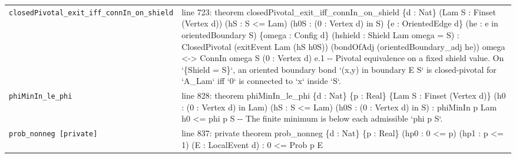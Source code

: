 \documentclass[10pt]{article}
\begin{document}
\begin{longtable}{>{\raggedright\arraybackslash}p{} >{\raggedright\arraybackslash}p{}}
\texttt{closedPivotal\_\allowbreak{}exit\_\allowbreak{}iff\_\allowbreak{}connIn\_\allowbreak{}on\_\allowbreak{}shield} & {\ttfamily\scriptsize line 723:\allowbreak{} theorem closedPivotal\_\allowbreak{}exit\_\allowbreak{}iff\_\allowbreak{}connIn\_\allowbreak{}on\_\allowbreak{}shield \{d :\allowbreak{} Nat\} (\allowbreak{}Lam S :\allowbreak{} Finset (\allowbreak{}Vertex d)\allowbreak{})\allowbreak{} (\allowbreak{}hS :\allowbreak{} S <=\allowbreak{} Lam)\allowbreak{} (\allowbreak{}h0S :\allowbreak{} (\allowbreak{}0 :\allowbreak{} Vertex d)\allowbreak{} in S)\allowbreak{} \{e :\allowbreak{} OrientedEdge d\} (\allowbreak{}he :\allowbreak{} e in orientedBoundary S)\allowbreak{} \{omega :\allowbreak{} Config d\} (\allowbreak{}hshield :\allowbreak{} Shield Lam omega =\allowbreak{} S)\allowbreak{} :\allowbreak{} ClosedPivotal (\allowbreak{}exitEvent Lam (\allowbreak{}hS h0S)\allowbreak{})\allowbreak{} (\allowbreak{}bondOfAdj (\allowbreak{}orientedBoundary\_\allowbreak{}adj he)\allowbreak{})\allowbreak{} omega <-\allowbreak{}> ConnIn omega S (\allowbreak{}0 :\allowbreak{} Vertex d)\allowbreak{} e.\allowbreak{}1 -\allowbreak{}-\allowbreak{} Pivotal equivalence on a fixed shield value.\allowbreak{} On `\{Shield =\allowbreak{} S\}`,\allowbreak{} an oriented boundary bond `(\allowbreak{}x,\allowbreak{}y)\allowbreak{} in boundary E S` is closed-\allowbreak{}pivotal for `A\_\allowbreak{}Lam` iff `0` is connected to `x` inside `S`.\allowbreak{}} \\[0.45em]
\texttt{phiMinIn\_\allowbreak{}le\_\allowbreak{}phi} & {\ttfamily\scriptsize line 828:\allowbreak{} theorem phiMinIn\_\allowbreak{}le\_\allowbreak{}phi \{d :\allowbreak{} Nat\} \{p :\allowbreak{} Real\} \{Lam S :\allowbreak{} Finset (\allowbreak{}Vertex d)\allowbreak{}\} (\allowbreak{}h0 :\allowbreak{} (\allowbreak{}0 :\allowbreak{} Vertex d)\allowbreak{} in Lam)\allowbreak{} (\allowbreak{}hS :\allowbreak{} S <=\allowbreak{} Lam)\allowbreak{} (\allowbreak{}h0S :\allowbreak{} (\allowbreak{}0 :\allowbreak{} Vertex d)\allowbreak{} in S)\allowbreak{} :\allowbreak{} phiMinIn p Lam h0 <=\allowbreak{} phi p S -\allowbreak{}-\allowbreak{} The finite minimum is below each admissible `phi p S`.\allowbreak{}} \\[0.45em]
\texttt{prob\_\allowbreak{}nonneg [private]} & {\ttfamily\scriptsize line 837:\allowbreak{} private theorem prob\_\allowbreak{}nonneg \{d :\allowbreak{} Nat\} \{p :\allowbreak{} Real\} (\allowbreak{}hp0 :\allowbreak{} 0 <=\allowbreak{} p)\allowbreak{} (\allowbreak{}hp1 :\allowbreak{} p <=\allowbreak{} 1)\allowbreak{} (\allowbreak{}E :\allowbreak{} LocalEvent d)\allowbreak{} :\allowbreak{} 0 <=\allowbreak{} Prob p E} \\[0.45em]

\end{longtable}
\end{document}
